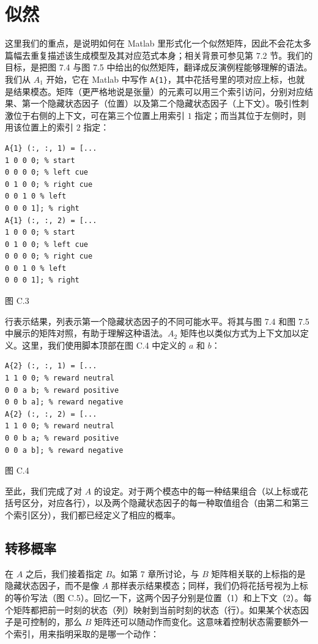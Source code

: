 \section{似然}

这里我们的重点，是说明如何在 Matlab 里形式化一个似然矩阵，因此不会花太多篇幅去重复描述该生成模型及其对应范式本身；相关背景可参见第 7.2 节。我们的目标，是把图 7.4 与图 7.5 中给出的似然矩阵，翻译成反演例程能够理解的语法。我们从 $A_1$ 开始，它在 Matlab 中写作 \verb|A{1}|，其中花括号里的项对应上标，也就是结果模态。矩阵（更严格地说是张量）的元素可以用三个索引访问，分别对应结果、第一个隐藏状态因子（位置）以及第二个隐藏状态因子（上下文）。吸引性刺激位于右侧的上下文，可在第三个位置上用索引 $1$ 指定；而当其位于左侧时，则用该位置上的索引 $2$ 指定：

\begin{verbatim}
A{1} (:, :, 1) = [...
1 0 0 0; % start
0 0 0 0; % left cue
0 1 0 0; % right cue
0 0 1 0 % left
0 0 0 1]; % right
A{1} (:, :, 2) = [...
1 0 0 0; % start
0 1 0 0; % left cue
0 0 0 0; % right cue
0 0 1 0 % left
0 0 0 1]; % right
\end{verbatim}

图 C.3

行表示结果，列表示第一个隐藏状态因子的不同可能水平。将其与图 7.4 和图 7.5 中展示的矩阵对照，有助于理解这种语法。$A_2$ 矩阵也以类似方式为上下文加以定义。这里，我们使用脚本顶部在图 C.4 中定义的 $a$ 和 $b$：

\begin{verbatim}
A{2} (:, :, 1) = [...
1 1 0 0; % reward neutral
0 0 a b; % reward positive
0 0 b a]; % reward negative
A{2} (:, :, 2) = [...
1 1 0 0; % reward neutral
0 0 b a; % reward positive
0 0 a b]; % reward negative
\end{verbatim}

图 C.4

至此，我们完成了对 $A$ 的设定。对于两个模态中的每一种结果组合（以上标或花括号区分，对应各行），以及两个隐藏状态因子的每一种取值组合（由第二和第三个索引区分），我们都已经定义了相应的概率。

\subsection{转移概率}

在 $A$ 之后，我们接着指定 $B$。如第 7 章所讨论，与 $B$ 矩阵相关联的上标指的是隐藏状态因子，而不是像 $A$ 那样表示结果模态；同样，我们仍将花括号视为上标的等价写法（图 C.5）。回忆一下，这两个因子分别是位置（1）和上下文（2）。每个矩阵都把前一时刻的状态（列）映射到当前时刻的状态（行）。如果某个状态因子是可控制的，那么 $B$ 矩阵还可以随动作而变化。这意味着控制状态需要额外一个索引，用来指明采取的是哪一个动作：

